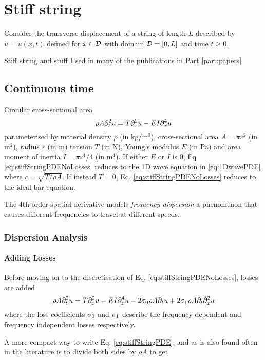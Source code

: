 \chapter{Stiff string}\label{ch:stiff string}
Consider the transverse displacement of a string of length $L$ described by $u=u(x,t)$ defined for $x\in \mathcal{D}$ with domain $\mathcal{D} = [0, L]$ and time $t\geq 0$. 

Stiff string and stuff
Used in many of the publications in Part \ref{part:papers}
\section{Continuous time}
Circular cross-sectional area
\begin{equation}\label{eq:stiffStringPDENoLosses}
    \rho A \partial_t^2 u = T \partial_x^2 u - EI \partial_x^4 u
\end{equation}
parameterised by material density $\rho$ (in kg/m$^3$), cross-sectional area $A = \pi r^2$ (in m$^2$), radius $r$ (in m) tension $T$ (in N), Young's modulus $E$ (in Pa) and area moment of inertia $I = \pi r^4/4$ (in m$^4$). If either $E$ or $I$ is 0, Eq \eqref{eq:stiffStringPDENoLosses} reduces to the 1D wave equation in \eqref{eq:1DwavePDE} where $c = \sqrt{T/\rho A}$. If instead $T = 0$, Eq. \eqref{eq:stiffStringPDENoLosses} reduces to the ideal bar equation.

The 4th-order spatial derivative models \textit{frequency dispersion} a phenomenon that causes different frequencies to travel at different speeds. 

\subsection{Dispersion Analysis}


\subsubsection{Adding Losses}
Before moving on to the discretisation of Eq. \eqref{eq:stiffStringPDENoLosses}, losses are added 
\begin{equation}\label{eq:stiffStringPDE}
    \rho A \partial_t^2 u = T \partial_x^2 u - EI \partial_x^4 u - 2 \sigma_{0} \rho A \partial_t u + 2 \sigma_{1} \rho A\partial_t \partial_x^2 u
\end{equation}
where the loss coefficients $\sigma_{0}$ and $\sigma_{1}$ describe the frequency dependent and frequency independent losses respectively. 

A more compact way to write Eq. \eqref{eq:stiffStringPDE}, and as is also found often in the literature \cite{theBible}  is to divide both sides by $\rho A$ to get

